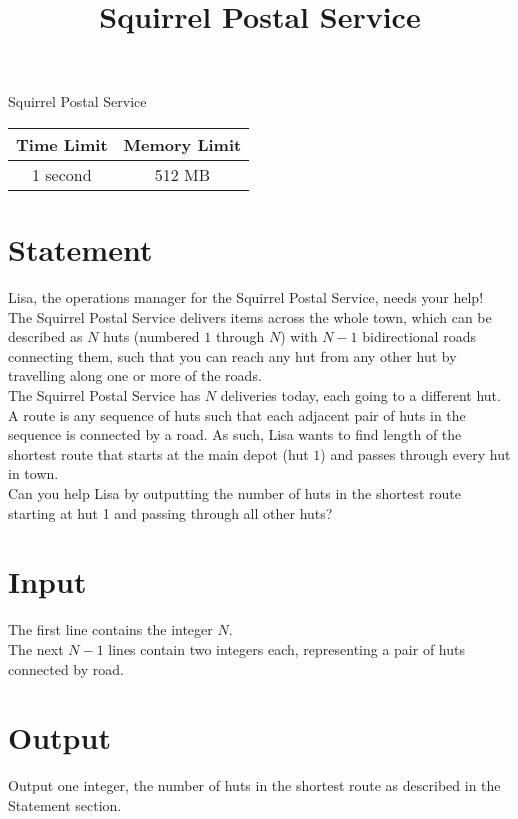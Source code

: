 \documentclass{article}
\begin{document}
\title{\vspace{-5ex}Squirrel Postal Service}
\author{\vspace{-5ex}}
\date{\vspace{-5ex}}
\pagestyle{fancy}
\fancyhf{}

\begin{center}
\huge{Squirrel Postal Service}\small\\
\vspace{5ex}
\begin{tabular}{|c|c|}
\hline
Time Limit & Memory Limit \\
\hline
1 second & 512 MB \\

\hline
\end{tabular}
\end{center}
\section*{Statement}
Lisa, the operations manager for the Squirrel Postal Service, needs your help! \\

The Squirrel Postal Service delivers items across the whole town, which can be
described as $N$ huts (numbered $1$ through $N$) with $N-1$ bidirectional roads connecting them, such that
you can reach any hut from any other hut by travelling along one or more of the
roads. \\

The Squirrel Postal Service has $N$ deliveries today, each going to a different
hut. A route is any sequence of huts such that each adjacent
pair of huts in the sequence is connected by a road. As such, Lisa wants to find length of the shortest
route that starts at the main depot (hut $1$) and passes through every
hut in town. \\

Can you help Lisa by outputting the number of huts in the shortest route starting at hut 1
and passing through all other huts?

\section*{Input}
The first line contains the integer $N$. \\

The next $N-1$ lines contain two integers each, representing a pair of huts connected
by road.

\section*{Output}
Output one integer, the number of huts in the shortest route as described in the Statement section.
\end{document}
